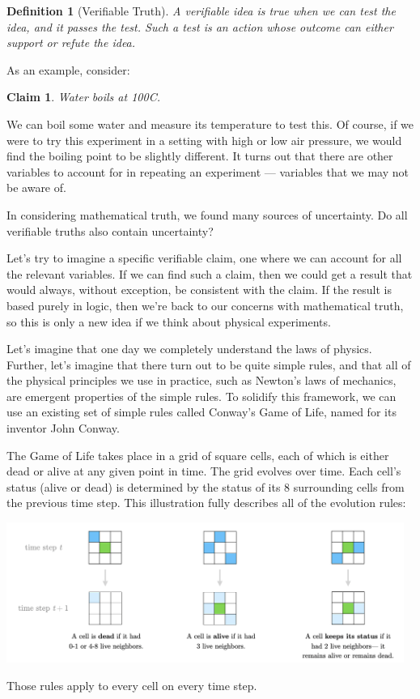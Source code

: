 \documentclass[11pt, oneside]{article}
\newtheorem*{defn}{Definition}
\newtheorem*{claim}{Claim}
\begin{document}
\begin{defn}[Verifiable Truth]
    A verifiable idea is true when we can test the idea, and it passes
    the test. Such a test is an action whose outcome
    can either support or refute the idea.
\end{defn}

As an example, consider:
\begin{claim}
    Water boils at 100\/\degree C.
\end{claim}
We can boil some water and measure its temperature to test this.
Of course,
if we were to try this experiment in a setting with high or low air pressure, we
would find the boiling point to be slightly different.
It turns out that
there are other variables to account for in repeating an experiment ---
variables that we may not be aware of.

In considering mathematical truth, we found many sources of uncertainty.
Do all verifiable truths also contain uncertainty?

Let's try to imagine a specific verifiable claim, one where we can
account for all the relevant variables. If we can find such a claim, then we
could get a result that would always, without exception, be
consistent with the claim.
If the result is based purely in logic, then we're
back to our concerns with mathematical truth, so this is only a new idea if we
think about physical experiments.

Let's imagine that one day we completely understand the laws of physics.
Further, let's imagine that there turn out to be quite simple rules, and that
all of the physical principles we use in practice, such as Newton's laws of
mechanics, are emergent properties of the simple rules.
To solidify this framework, we can use an existing set of simple rules
called Conway's Game of Life, named for its inventor John Conway.

The Game of Life takes place in a grid of square cells, each of which is either
dead or alive at any given point in time. The grid evolves over
time. Each cell's status (alive or dead) is determined by the status of its 8
surrounding cells from the previous time step. This illustration fully
describes all of the evolution rules:
\begin{center}
\includegraphics[width=13cm]{gameoflife.png}
\end{center}
Those rules apply to every cell on every time step.
\end{document}
